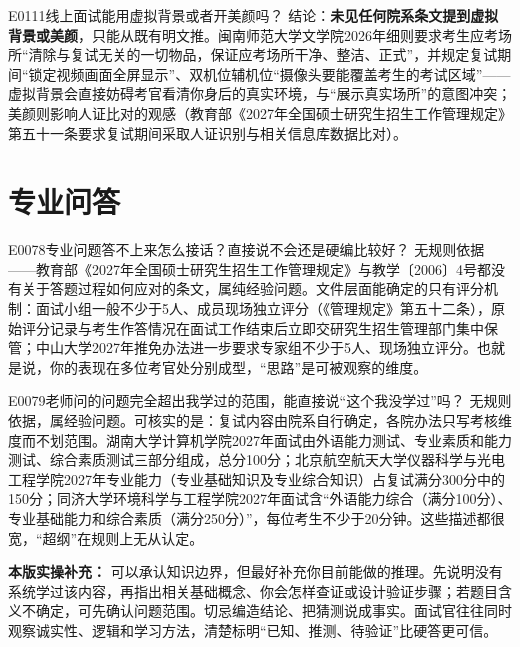 \begin{qa}{E0111}{线上面试能用虚拟背景或者开美颜吗？}
结论：\textbf{未见任何院系条文提到虚拟背景或美颜}，只能从既有明文推。闽南师范大学文学院2026年细则要求考生应考场所“清除与复试无关的一切物品，保证应考场所干净、整洁、正式”，并规定复试期间“锁定视频画面全屏显示”、双机位辅机位“摄像头要能覆盖考生的考试区域”——虚拟背景会直接妨碍考官看清你身后的真实环境，与“展示真实场所”的意图冲突；美颜则影响人证比对的观感（教育部《2027年全国硕士研究生招生工作管理规定》第五十一条要求复试期间采取人证识别与相关信息库数据比对）。
\end{qa}

\section{专业问答}
\begin{qa}{E0078}{专业问题答不上来怎么接话？直接说不会还是硬编比较好？}
无规则依据——教育部《2027年全国硕士研究生招生工作管理规定》与教学〔2006〕4号都没有关于答题过程如何应对的条文，属纯经验问题。文件层面能确定的只有评分机制：面试小组一般不少于5人、成员现场独立评分（《管理规定》第五十二条），原始评分记录与考生作答情况在面试工作结束后立即交研究生招生管理部门集中保管；中山大学2027年推免办法进一步要求专家组不少于5人、现场独立评分。也就是说，你的表现在多位考官处分别成型，“思路”是可被观察的维度。
\end{qa}

\begin{qa}{E0079}{老师问的问题完全超出我学过的范围，能直接说“这个我没学过”吗？}
无规则依据，属经验问题。可核实的是：复试内容由院系自行确定，各院办法只写考核维度而不划范围。湖南大学计算机学院2027年面试由外语能力测试、专业素质和能力测试、综合素质测试三部分组成，总分100分；北京航空航天大学仪器科学与光电工程学院2027年专业能力（专业基础知识及专业综合知识）占复试满分300分中的150分；同济大学环境科学与工程学院2027年面试含“外语能力综合（满分100分）、专业基础能力和综合素质（满分250分）”，每位考生不少于20分钟。这些描述都很宽，“超纲”在规则上无从认定。
\par\textbf{本版实操补充：} 可以承认知识边界，但最好补充你目前能做的推理。先说明没有系统学过该内容，再指出相关基础概念、你会怎样查证或设计验证步骤；若题目含义不确定，可先确认问题范围。切忌编造结论、把猜测说成事实。面试官往往同时观察诚实性、逻辑和学习方法，清楚标明“已知、推测、待验证”比硬答更可信。
\end{qa}

